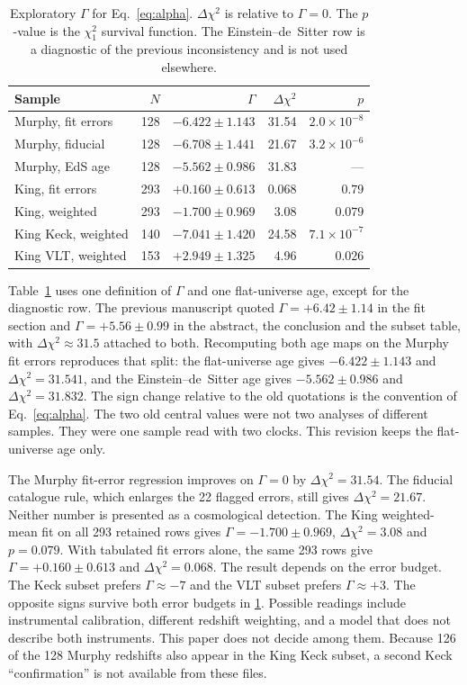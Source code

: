 \begin{table}[t]
  \centering
  \caption{Exploratory $\Gamma$ for Eq.~\eqref{eq:alpha}.
  $\Delta\chi^{2}$ is relative to $\Gamma=0$.
  The $p$-value is the $\chi^{2}_{1}$ survival function.
  The Einstein--de~Sitter row is a diagnostic of the previous inconsistency and is not used elsewhere.}
  \label{tab:gamma}
  \scriptsize
  \begin{tabular}{@{}lrrrr@{}}
    \toprule
    Sample & $N$ & $\Gamma$ & $\Delta\chi^{2}$ & $p$ \\
    \midrule
    Murphy, fit errors & 128 & $-6.422\pm1.143$ & 31.54 & $2.0\times10^{-8}$ \\
    Murphy, fiducial    & 128 & $-6.708\pm1.441$ & 21.67 & $3.2\times10^{-6}$ \\
    Murphy, EdS age     & 128 & $-5.562\pm0.986$ & 31.83 & --- \\
    King, fit errors    & 293 & $+0.160\pm0.613$ & 0.068 & $0.79$ \\
    King, weighted      & 293 & $-1.700\pm0.969$ & 3.08  & $0.079$ \\
    King Keck, weighted & 140 & $-7.041\pm1.420$ & 24.58 & $7.1\times10^{-7}$ \\
    King VLT, weighted  & 153 & $+2.949\pm1.325$ & 4.96  & $0.026$ \\
    \bottomrule
  \end{tabular}
\end{table}

Table~\ref{tab:gamma} uses one definition of $\Gamma$ and one flat-universe age, except for the diagnostic row.
The previous manuscript quoted $\Gamma=+6.42\pm1.14$ in the fit section and $\Gamma=+5.56\pm0.99$ in the abstract, the conclusion and the subset table, with $\Delta\chi^{2}\approx31.5$ attached to both.
Recomputing both age maps on the Murphy fit errors reproduces that split: the flat-universe age gives $-6.422\pm1.143$ and $\Delta\chi^{2}=31.541$, and the Einstein--de~Sitter age gives $-5.562\pm0.986$ and $\Delta\chi^{2}=31.832$.
The sign change relative to the old quotations is the convention of Eq.~\eqref{eq:alpha}.
The two old central values were not two analyses of different samples.
They were one sample read with two clocks.
This revision keeps the flat-universe age only.

The Murphy fit-error regression improves on $\Gamma=0$ by $\Delta\chi^{2}=31.54$.
The fiducial catalogue rule, which enlarges the 22 flagged errors, still gives $\Delta\chi^{2}=21.67$.
Neither number is presented as a cosmological detection.
The King weighted-mean fit on all 293 retained rows gives $\Gamma=-1.700\pm0.969$, $\Delta\chi^{2}=3.08$ and $p=0.079$.
With tabulated fit errors alone, the same 293 rows give $\Gamma=+0.160\pm0.613$ and $\Delta\chi^{2}=0.068$.
The result depends on the error budget.
The Keck subset prefers $\Gamma\approx-7$ and the VLT subset prefers $\Gamma\approx+3$.
The opposite signs survive both error budgets in \cref{tab:gamma}.
Possible readings include instrumental calibration, different redshift weighting, and a model that does not describe both instruments.
This paper does not decide among them.
Because 126 of the 128 Murphy redshifts also appear in the King Keck subset, a second Keck ``confirmation'' is not available from these files.

